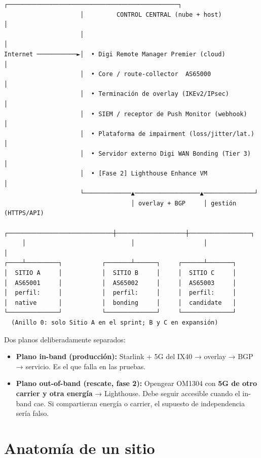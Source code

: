 \documentclass[11pt,a4paper]{article}
\begin{document}
\begin{diagbox}
\begin{Verbatim}[fontsize=\footnotesize]
                     ┌───────────────────────────────────────────────┐
                     │         CONTROL CENTRAL (nube + host)          │
                     │                                                │
Internet ───────────►│  • Digi Remote Manager Premier (cloud)         │
                     │  • Core / route-collector  AS65000             │
                     │  • Terminación de overlay (IKEv2/IPsec)        │
                     │  • SIEM / receptor de Push Monitor (webhook)   │
                     │  • Plataforma de impairment (loss/jitter/lat.) │
                     │  • Servidor externo Digi WAN Bonding (Tier 3)  │
                     │  • [Fase 2] Lighthouse Enhance VM              │
                     └─────────────▲──────────────────▲──────────────┘
                                   │ overlay + BGP     │ gestión (HTTPS/API)
     ┌─────────────────────────────┼───────────────────┼─────────────────┐
     │                             │                   │                 │
┌────┴─────────┐           ┌───────┴──────┐     ┌──────┴───────┐
│  SITIO A     │           │  SITIO B     │     │  SITIO C     │
│  AS65001     │           │  AS65002     │     │  AS65003     │
│  perfil:     │           │  perfil:     │     │  perfil:     │
│  native      │           │  bonding     │     │  candidate   │
└──────────────┘           └──────────────┘     └──────────────┘
  (Anillo 0: solo Sitio A en el sprint; B y C en expansión)
\end{Verbatim}
\end{diagbox}

\medskip
Dos planos deliberadamente separados:

\begin{itemize}
  \item \textbf{Plano in-band (producción):} Starlink + 5G del IX40 → overlay → BGP → servicio.
        Es el que falla en las pruebas.
  \item \textbf{Plano out-of-band (rescate, fase 2):} Opengear OM1304 con
        \textbf{5G de otro carrier y otra energía} → Lighthouse. Debe seguir accesible cuando el
        in-band cae. Si compartieran energía o carrier, el supuesto de independencia sería falso.
\end{itemize}

\section{Anatomía de un sitio}
\end{document}
